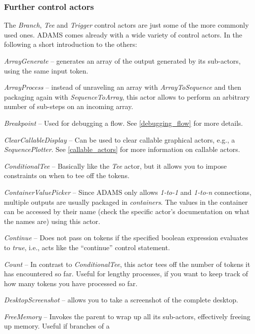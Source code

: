 \subsubsection{Further control actors}
The \textit{Branch}, \textit{Tee} and \textit{Trigger} control actors are just
some of the more commonly used ones. ADAMS comes already with a wide variety of
control actors. In the following a short introduction to the others:
\begin{tight_itemize}
	\item \textit{ArrayGenerate} -- generates an array of the output
	generated by its sub-actors, using the same input token.
	\item \textit{ArrayProcess} -- instead of unraveling an array with
	\textit{ArrayToSequence} and then packaging again with
	\textit{SequenceToArray}, this actor allows to perform an arbitrary number of
	sub-steps on an incoming array.
	\item \textit{Breakpoint} -- Used for debugging a flow. See
	\ref{debugging_flow} for more details.
	\item \textit{ClearCallableDisplay} -- Can be used to clear callable
	graphical actors, e.g., a \textit{SequencePlotter}. See \ref{callable_actors} for
	more information on callable actors.
	\item \textit{ConditionalTee} -- Basically like the \textit{Tee} actor, but it
	allows you to impose constraints on when to tee off the tokens.
	\item \textit{ContainerValuePicker} -- Since ADAMS only allows \textit{1-to-1}
	and \textit{1-to-n} connections, multiple outputs are usually packaged in
	\textit{containers}. The values in the container can be accessed by their name
	(check the specific actor's documentation on what the names are) using this
	actor.
	\item \textit{Continue} -- Does not pass on tokens if the specified boolean
	expression evaluates to \textit{true}, i.e., acts like the ``continue'' 
	control statement.
	\item \textit{Count} -- In contrast to \textit{ConditionalTee}, this actor tees
	off the number of tokens it has encountered so far. Useful for lengthy
	processes, if you want to keep track of how many tokens you have processed so
	far.
	\item \textit{DesktopScreenshot} -- allows you to take a screenshot
	of the complete desktop.
	\item \textit{FreeMemory} -- Invokes the parent to wrap up all its
	sub-actors, effectively freeing up memory. Useful if branches of a

\end{tight_itemize}
